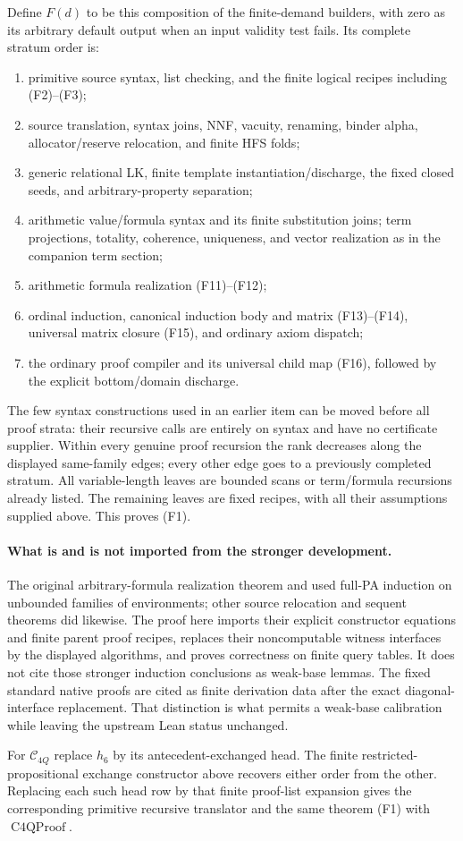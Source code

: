 Define $F(d)$ to be this composition of the finite-demand builders,
with zero as its arbitrary default output when an input validity
test fails.  Its complete stratum order is:
\begin{enumerate}
\item primitive source syntax, list checking, and the finite logical
      recipes including (F2)--(F3);
\item source translation, syntax joins, NNF, vacuity, renaming,
      binder alpha, allocator/reserve relocation, and finite HFS folds;
\item generic relational LK, finite template instantiation/discharge,
      the fixed closed seeds, and arbitrary-property separation;
\item arithmetic value/formula syntax and its finite substitution
      joins; term projections, totality, coherence, uniqueness, and
      vector realization as in the companion term section;
\item arithmetic formula realization (F11)--(F12);
\item ordinal induction, canonical induction body and matrix
      (F13)--(F14), universal matrix closure (F15), and ordinary
      axiom dispatch;
\item the ordinary proof compiler and its universal child map (F16),
      followed by the explicit bottom/domain discharge.
\end{enumerate}
The few syntax constructions used in an earlier item can be moved
before all proof strata: their recursive calls are entirely on
syntax and have no certificate supplier.  Within every genuine
proof recursion the rank decreases along the displayed same-family
edges; every other edge goes to a previously completed stratum.
All variable-length leaves are bounded scans or term/formula
recursions already listed.  The remaining leaves are fixed recipes,
with all their assumptions supplied above.  This proves (F1).

\paragraph{What is and is not imported from the stronger development.}
The original arbitrary-formula realization theorem and
 used full-PA induction on unbounded
families of environments; other source relocation and sequent
theorems did likewise.  The proof here imports their explicit
constructor equations and finite parent proof recipes, replaces
their noncomputable witness interfaces by the displayed algorithms,
and proves correctness on finite query tables.  It does not cite
those stronger induction conclusions as weak-base lemmas.  The
fixed standard native proofs are cited as finite derivation data
after the exact diagonal-interface replacement.  That distinction
is what permits a weak-base calibration while leaving the upstream
Lean status unchanged.

For $\mathcal C_{4Q}$ replace $h_6$ by its antecedent-exchanged head.
The finite restricted-propositional exchange constructor above
recovers either order from the other.  Replacing each such head
row by that finite proof-list expansion gives the corresponding
primitive recursive translator and the same theorem (F1) with
$\operatorname{C4QProof}$.
